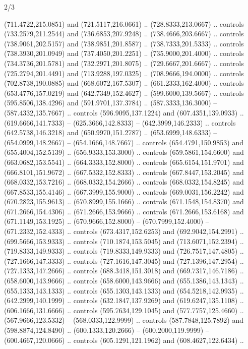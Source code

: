\begin{flagdescription}{2/3}
\begin{scope}[xshift=0.5\flaglength,yshift=0.5\flagwidth,scale=\flagwidth/525.28]
\begin{scope}[y=0.1mm, x=0.1mm, yscale=-1,shift={(-381.5,-404)}]
\begin{scope}[shift={(5.25001,4.53053)},miter limit=4.00,line width=0.800\lw]
  (711.4722,215.0851) and (721.5117,216.0661) .. (728.8333,213.0667) .. controls
  (733.2579,211.2544) and (736.6853,207.9248) .. (738.4666,203.6667) .. controls
  (738.9061,202.5157) and (738.9851,201.8587) .. (738.7333,201.5333) .. controls
  (738.3930,201.0949) and (737.4050,201.2251) .. (735.9000,201.4000) .. controls
  (734.3736,201.5781) and (732.2971,201.8075) .. (729.6667,201.6667) .. controls
  (725.2794,201.4491) and (713.9288,197.0325) .. (708.9666,194.0000) .. controls
  (702.8738,190.0885) and (668.6072,167.5307) .. (661.2333,162.4000) .. controls
  (653.4776,157.0219) and (642.7349,152.4627) .. (599.6000,139.5667) .. controls
  (595.8506,138.4296) and (591.9701,137.3784) .. (587.3333,136.3000) --
  (587.4332,135.7667) .. controls (596.9095,137.1224) and (607.4351,139.0933) ..
  (619.6666,141.7333) -- (625.3666,142.8333) -- (642.3999,146.2333) .. controls
  (642.5738,146.3218) and (650.9970,151.2787) .. (653.6999,148.6333) --
  (654.0999,148.2667) -- (654.1666,148.7667) .. controls (654.4791,150.9853) and
  (655.4004,152.5139) .. (656.9333,153.3000) .. controls (659.5861,154.6600) and
  (663.0682,153.5541) .. (664.3333,152.8000) .. controls (665.6154,151.9701) and
  (666.8101,151.9672) .. (667.5332,152.8333) .. controls (667.8447,153.2045) and
  (668.0332,153.7216) .. (668.0332,154.2666) .. controls (668.0332,154.8245) and
  (667.8533,155.4146) .. (667.3999,155.9000) .. controls (669.0031,156.2242) and
  (670.2823,155.9613) .. (670.8999,155.1666) .. controls (671.1548,154.8370) and
  (671.2666,154.4306) .. (671.2666,153.9666) .. controls (671.2666,153.6168) and
  (671.1149,153.1925) .. (670.9666,152.8000) -- (670.7999,152.4000) --
  (671.2332,152.4333) .. controls (673.4317,152.6253) and (692.9042,154.2991) ..
  (699.5666,153.9333) .. controls (710.1874,153.5045) and (713.6071,152.2394) ..
  (719.8333,149.9333) .. controls (719.8333,149.9333) and (726.7517,147.4805) ..
  (727.1666,147.3333) .. controls (727.1616,147.3045) and (727.1396,147.2954) ..
  (727.1333,147.2666) .. controls (688.3418,151.3018) and (669.7317,146.7186) ..
  (658.6000,143.9666) .. controls (658.6000,143.9666) and (655.1386,143.1343) ..
  (655.1333,143.1333) .. controls (655.1303,143.1333) and (654.5218,142.9935) ..
  (642.2999,140.1999) .. controls (632.1847,137.9269) and (619.6247,135.1108) ..
  (606.1666,131.6666) .. controls (595.7634,129.1045) and (577.7757,125.4660) ..
  (567.9666,123.5332) -- (568.0333,122.9999) .. controls (587.7848,125.7892) and
  (598.8874,124.8490) .. (600.1333,120.2666) -- (600.2000,119.9999) --
  (600.4667,120.0666) .. controls (605.1291,121.1962) and (608.4627,122.6434) ..

\end{scope}
\end{scope}
\end{scope}
\end{flagdescription}
